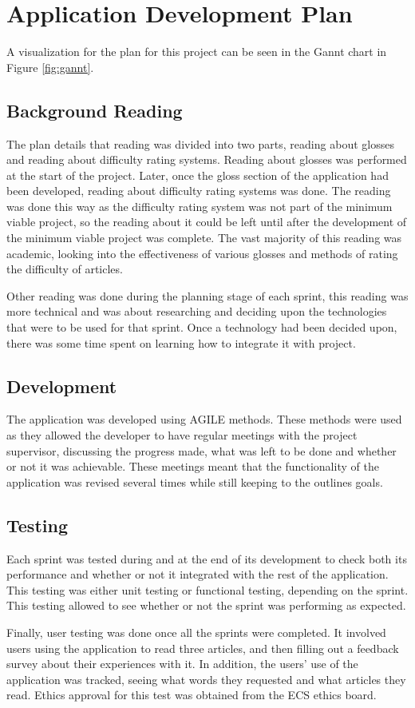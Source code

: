 \chapter{Application Development Plan}

A visualization for the plan for this project can be seen in the Gannt chart in Figure \ref{fig:gannt}.
 

\section{Background Reading}

The plan details that reading was divided into two parts, reading about glosses and reading about difficulty rating systems. Reading about glosses was performed at the start of the project. Later, once the gloss section of the application had been developed, reading about difficulty rating systems was done. The reading was done this way as the difficulty rating system was not part of the minimum viable project, so the reading about it could be left until after the development of the minimum viable project was complete. The vast majority of this reading was academic, looking into the effectiveness of various glosses and methods of rating the difficulty of articles.

Other reading was done during the planning stage of each sprint, this reading was more technical and was about researching and deciding upon the technologies that were to be used for that sprint. Once a technology had been decided upon, there was some time spent on learning how to integrate it with project.


\section{Development}

The application was developed using AGILE methods. These methods were used as they allowed the developer to have regular meetings with the project supervisor, discussing the progress made, what was left to be done and whether or not it was achievable. These meetings meant that the functionality of the application was revised several times while still keeping to the outlines goals. 

\section{Testing}

Each sprint was tested during and at the end of its development to check both its performance and whether or not it integrated with the rest of the application. This testing was either unit testing or functional testing, depending on the sprint. This testing allowed to see whether or not the sprint was performing as expected.

Finally, user testing was done once all the sprints were completed. It involved users using the application to read three articles, and then filling out a feedback survey about their experiences with it. In addition, the users' use of the application was tracked, seeing what words they requested and what articles they read. Ethics approval for this test was obtained from the ECS ethics board. 